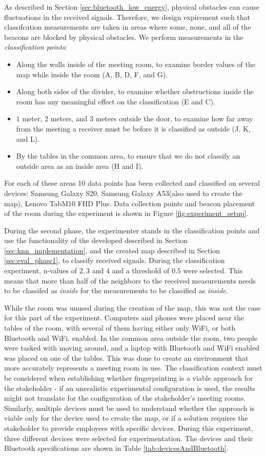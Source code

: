 As described in Section \ref{sec:bluetooth_low_energy}, physical obstacles can cause fluctuations in the received signals. 
Therefore, we design expirement such that classifcation measurements are taken in areas where some, none, and all of the beacons are blocked by physical obstacles. 
We perform measurements in the \textit{classification points}:
\begin{itemize}
    \item Along the walls inside of the meeting room, to examine border values of the map while inside the room (A, B, D, F, and G).
    \item Along both sides of the divider, to examine whether obstructions inside the room has any meaningful effect on the classification (E and C).
    \item $1$ meter, $2$ meters, and $3$ meters outside the door, to examine how far away from the meeting a receiver must be before it is classified as outside (J, K, and L).
    \item By the tables in the common area, to ensure that we do not classify an outside area as an inside area (H and I).
\end{itemize}
For each of these areas 10 data points has been collected and classified on several devices: Samsung Galaxy S20, Samsung Galaxy A53(also used to create the map), Lenovo TabM10 FHD Plus.
Data collection points and beacon placement of the room during the experiment is shown in Figure \ref{fig:experiment_setup}. 

During the second phase, the experimenter stands in the classification points and use the functionality of the developed described in Section \ref{sec:knn_implementation}, and the created map described in Section \ref{sec:eval_phase1}, to classify received signals. 
During the classification experiment, n-values of $2,3$ and $4$ and a threshold of $0.5$ were selected. 
This means that more than half of the neighbors to the received measurements needs to be classifed as \textit{inside} for the measurements to be classified as \textit{inside}.

While the room was unused during the creation of the map, this was not the case for this part of the experiment.
Computers and phones were placed near the tables of the room, with several of them having either only WiFi, or both Bluetooth and WiFi, enabled. 
In the common area outside the room, two people were tasked with moving around, and a laptop with Bluetooth and WiFi enabled was placed on one of the tables.
This was done to create an environment that more accurately represents a meeting room in use.
The classification context must be considered when establishing whether fingerprinting is a viable approach for the stakeholder - if an unrealistic experimental configuration is used, the results might not translate for the configuration of the stakeholder's meeting rooms. 
Similarly, multiple devices must be used to understand whether the approach is viable only for the device used to create the map, or if a solution requires the stakeholder to provide employees with specific devices. 
During this experiment, three different devices were selected for experimentation. 
The devices and their Bluetooth specifications are shown in Table \ref{tab:devicesAndBluetooth}.

